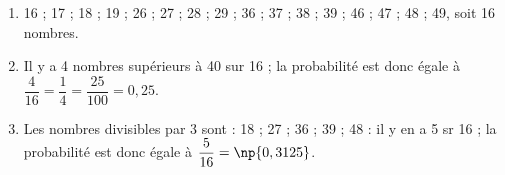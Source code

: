 \documentclass[10pt]{article}
\begin{document}
\medskip
 
\begin{enumerate}
\item %

16 ; 17 ; 18 ; 19 ; 26 ; 27 ; 28 ; 29 ; 36 ; 37 ; 38 ; 39 ; 46 ; 47 ; 48 ; 49, soit 16 nombres. 
\item %
Il y a 4 nombres supérieurs à 40 sur 16 ; la probabilité est donc égale à $\dfrac{4}{16} = \dfrac{1}{4} = \dfrac{25}{100} = 0,25$.
 
\item %
Les nombres divisibles par 3 sont : 18 ; 27 ; 36 ; 39 ; 48 : il y en a 5 sr 16 ; la probabilité est donc égale à $\dfrac{5}{16} = \np{0,3125}$.
\end{enumerate} 

\vspace{0.5cm}
\end{document}
